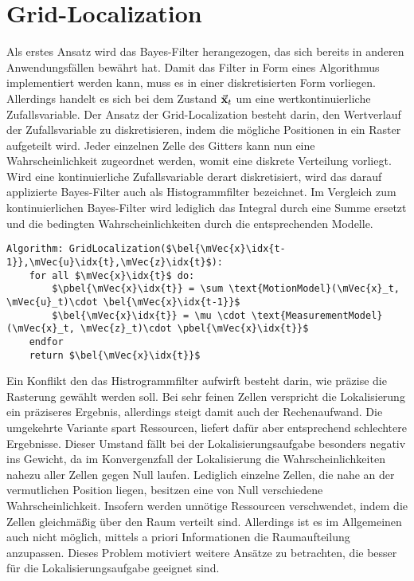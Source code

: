 \section{Grid-Localization}
Als erstes Ansatz wird das Bayes-Filter herangezogen, das sich bereits in anderen Anwendungsfällen bewährt hat. Damit das Filter in Form eines Algorithmus implementiert werden kann, muss es in einer diskretisierten Form vorliegen. Allerdings handelt es sich bei dem Zustand $\vec{\mathbf{x}}_t$ um eine wertkontinuierliche Zufallsvariable. Der Ansatz der Grid-Localization besteht darin, den Wertverlauf der Zufallsvariable zu diskretisieren, indem die mögliche Positionen in ein Raster aufgeteilt wird. Jeder einzelnen Zelle des Gitters kann nun eine Wahrscheinlichkeit zugeordnet werden, womit eine diskrete Verteilung vorliegt. Wird eine kontinuierliche Zufallsvariable derart diskretisiert, wird das darauf applizierte Bayes-Filter auch als Histogrammfilter bezeichnet. Im Vergleich zum kontinuierlichen Bayes-Filter wird lediglich das Integral durch eine Summe ersetzt und die bedingten Wahrscheinlichkeiten durch die entsprechenden Modelle.
\begin{lstlisting}[mathescape=true, caption={Grid-Localization},captionpos=b]
Algorithm: GridLocalization($\bel{\mVec{x}\idx{t-1}},\mVec{u}\idx{t},\mVec{z}\idx{t}$):
	for all $\mVec{x}\idx{t}$ do:
		$\pbel{\mVec{x}\idx{t}} = \sum \text{MotionModel}(\mVec{x}_t, \mVec{u}_t)\cdot \bel{\mVec{x}\idx{t-1}}$
		$\bel{\mVec{x}\idx{t}} = \mu \cdot \text{MeasurementModel}(\mVec{x}_t, \mVec{z}_t)\cdot \pbel{\mVec{x}\idx{t}}$
	endfor
	return $\bel{\mVec{x}\idx{t}}$
\end{lstlisting}
Ein Konflikt den das Histrogrammfilter aufwirft besteht darin, wie präzise die Rasterung gewählt werden soll. Bei sehr feinen Zellen verspricht die Lokalisierung ein präziseres Ergebnis, allerdings steigt damit auch der Rechenaufwand. Die umgekehrte Variante spart Ressourcen, liefert dafür aber entsprechend schlechtere Ergebnisse. Dieser Umstand fällt bei der Lokalisierungsaufgabe besonders negativ ins Gewicht, da im Konvergenzfall der Lokalisierung die Wahrscheinlichkeiten nahezu aller Zellen gegen Null laufen. Lediglich einzelne Zellen, die nahe an der vermutlichen Position liegen, besitzen eine von Null verschiedene Wahrscheinlichkeit. Insofern werden unnötige Ressourcen verschwendet, indem die Zellen gleichmäßig über den Raum verteilt sind. Allerdings ist es im Allgemeinen auch nicht möglich, mittels a priori Informationen die Raumaufteilung anzupassen. Dieses Problem motiviert weitere Ansätze zu betrachten, die besser für die Lokalisierungsaufgabe geeignet sind.

